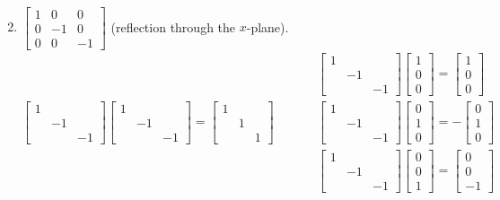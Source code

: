 \documentclass[twoside]{amsart}
\theoremstyle{plain}
\theoremstyle{definition}
\begin{document}
\begin{enumerate}
\[\begin{aligned}
    \end{aligned} 
\]
  \item $\left[ \begin{matrix} 1 & 0 & 0 \\ 0 & -1 & 0 \\ 0 & 0 & -1 \end{matrix} \right]$ (reflection through the $x$-plane).  
    \[
    \left[ \begin{matrix} 1 & & \\ & -1 & \\ & & -1 \end{matrix} \right] \left[ \begin{matrix} 1 & & \\ & -1 & \\ & & - 1 \end{matrix} \right] = \left[ \begin{matrix} 1 & & \\ & 1 & \\ & & 1 \end{matrix} \right] \quad \quad \, 
    \begin{aligned} 
      & \left[ \begin{matrix} 1 &  & \\ & -1 & \\ & & -1 \end{matrix} \right] \left[ \begin{matrix} 1 \\ 0 \\ 0 \end{matrix} \right] = \left[ \begin{matrix} 1 \\ 0 \\ 0 \end{matrix} \right]  \\ & \left[ \begin{matrix} 1 &  & \\ & -1 & \\ & & -1 \end{matrix} \right] \left[ \begin{matrix} 0 \\ 1 \\ 0 \end{matrix} \right] = -\left[ \begin{matrix} 0 \\ 1 \\ 0 \end{matrix} \right] \\ 
      & \left[ \begin{matrix} 1 &  & \\ & -1 & \\ & & -1 \end{matrix} \right] \left[ \begin{matrix} 0 \\ 0 \\ 1 \end{matrix} \right] = \left[ \begin{matrix} 0 \\ 0 \\ -1 \end{matrix} \right] 

\end{aligned}\]
\end{enumerate}
\end{document}

